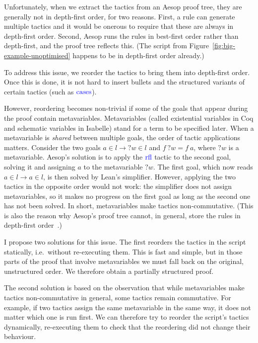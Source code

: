 \documentclass[sigplan,10pt,anonymous,review]{acmart}
\newcommand{\tac}[1]{\ensuremath{\mathrm{\mathcolor{blue}{#1}}}}
\newcommand{\mvar}[1]{{?#1}}
\begin{document}
Unfortunately, when we extract the tactics from an Aesop proof tree, they are generally not in depth-first order, for two reasons.
First, a rule can generate multiple tactics and it would be onerous to require that these are always in depth-first order.
Second, Aesop runs the rules in best-first order rather than depth-first, and the proof tree reflects this.
(The script from Figure~\ref{fig:big-example-unoptimised} happens to be in depth-first order already.)

To address this issue, we reorder the tactics to bring them into depth-first order.
Once this is done, it is not hard to insert bullets and the structured variants of certain tactics (such as \tac{cases}).

However, reordering becomes non-trivial if some of the goals that appear during the proof contain metavariables.
Metavariables (called existential variables in Coq and schematic variables in Isabelle) stand for a term to be specified later.
When a metavariable is \emph{shared} between multiple goals, the order of tactic applications matters.
Consider the two goals $a ∈ l → \mvar{w} ∈ l$ and $f~\mvar{w} = f~a$, where $\mvar{w}$ is a metavariable.
Aesop's solution is to apply the \tac{rfl} tactic to the second goal, solving it and assigning $a$ to the metavariable $\mvar{w}$.
The first goal, which now reads $a ∈ l → a ∈ l$, is then solved by Lean's simplifier.
However, applying the two tactics in the opposite order would not work: the simplifier does not assign metavariables, so it makes no progress on the first goal as long as the second one has not been solved.
In short, metavariables make tactics non-commutative.
(This is also the reason why Aesop's proof tree cannot, in general, store the rules in depth-first order~\cite[Section~4]{Aesop}.)

I propose two solutions for this issue.
The first reorders the tactics in the script statically, i.e.\ without re-executing them.
This is fast and simple, but in those parts of the proof that involve metavariables we must fall back on the original, unstructured order.
We therefore obtain a partially structured proof.

The second solution is based on the observation that while metavariables make tactics non-commutative in general, some tactics remain commutative.
For example, if two tactics assign the same metavariable in the same way, it does not matter which one is run first.
We can therefore try to reorder the script's tactics dynamically, re-executing them to check that the reordering did not change their behaviour.
\end{document}
